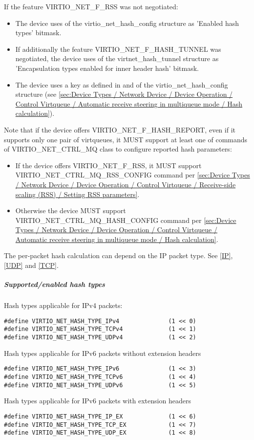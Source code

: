 If the feature VIRTIO_NET_F_RSS was not negotiated:
\begin{itemize}
\item The device uses  of the virtio_net_hash_config structure as 'Enabled hash types' bitmask.
\item If additionally the feature VIRTIO_NET_F_HASH_TUNNEL was negotiated, the device uses  of the
      virtnet_hash_tunnel structure as 'Encapsulation types enabled for inner header hash' bitmask.
\item The device uses a key as defined in  and  of the virtio_net_hash_config structure (see
\ref{sec:Device Types / Network Device / Device Operation / Control Virtqueue / Automatic receive steering in multiqueue mode / Hash calculation}).
\end{itemize}

Note that if the device offers VIRTIO_NET_F_HASH_REPORT, even if it supports only one pair of virtqueues, it MUST support
at least one of commands of VIRTIO_NET_CTRL_MQ class to configure reported hash parameters:
\begin{itemize}
\item If the device offers VIRTIO_NET_F_RSS, it MUST support VIRTIO_NET_CTRL_MQ_RSS_CONFIG command per
 \ref{sec:Device Types / Network Device / Device Operation / Control Virtqueue / Receive-side scaling (RSS) / Setting RSS parameters}.
\item Otherwise the device MUST support VIRTIO_NET_CTRL_MQ_HASH_CONFIG command per
 \ref{sec:Device Types / Network Device / Device Operation / Control Virtqueue / Automatic receive steering in multiqueue mode / Hash calculation}.
\end{itemize}

The per-packet hash calculation can depend on the IP packet type. See
\hyperref[intro:IP]{[IP]}, \hyperref[intro:UDP]{[UDP]} and \hyperref[intro:TCP]{[TCP]}.

\subparagraph{Supported/enabled hash types}
\label{sec:Device Types / Network Device / Device Operation / Processing of Incoming Packets / Hash calculation for incoming packets / Supported/enabled hash types}
Hash types applicable for IPv4 packets:
\begin{lstlisting}
#define VIRTIO_NET_HASH_TYPE_IPv4              (1 << 0)
#define VIRTIO_NET_HASH_TYPE_TCPv4             (1 << 1)
#define VIRTIO_NET_HASH_TYPE_UDPv4             (1 << 2)
\end{lstlisting}
Hash types applicable for IPv6 packets without extension headers
\begin{lstlisting}
#define VIRTIO_NET_HASH_TYPE_IPv6              (1 << 3)
#define VIRTIO_NET_HASH_TYPE_TCPv6             (1 << 4)
#define VIRTIO_NET_HASH_TYPE_UDPv6             (1 << 5)
\end{lstlisting}
Hash types applicable for IPv6 packets with extension headers
\begin{lstlisting}
#define VIRTIO_NET_HASH_TYPE_IP_EX             (1 << 6)
#define VIRTIO_NET_HASH_TYPE_TCP_EX            (1 << 7)
#define VIRTIO_NET_HASH_TYPE_UDP_EX            (1 << 8)
\end{lstlisting}

